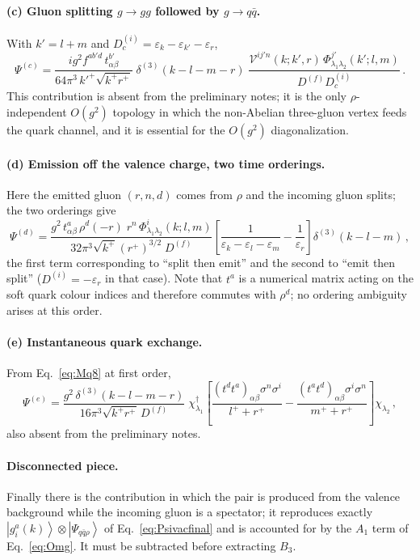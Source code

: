 \documentclass[11pt]{article}
\newcommand{\eps}{\varepsilon}
\newcommand{\dg}{\dagger}
\newcommand{\ket}[1]{\left|#1\right\rangle}
\newcommand{\dthree}{\delta^{(3)}}
\newcommand{\gl}[3]{g^{#1}_{#2}(#3)}
\newcommand{\Phiv}{\Phi}
\newcommand{\Vggg}{\mathcal{V}}
\begin{document}
\paragraph{(c) Gluon splitting $g\to gg$ followed by $g\to q\bar q$.} With $k'=l+m$ and
$D^{(i)}_c=\eps_k-\eps_{k'}-\eps_r$,
\begin{equation}
\Psi^{(c)}=\frac{i g^2 f^{ab'd}\,t^{b'}_{\alpha\beta}}{64\pi^3\,k'^+\sqrt{k^+r^+}}\;
\dthree(k-l-m-r)\;
\frac{\Vggg^{ij'n}(k;k',r)\,\Phiv^{j'}_{\lambda_1\lambda_2}(k';l,m)}{D^{(f)}D^{(i)}_c}\,.
\end{equation}
This contribution is absent from the preliminary notes; it is the only $\rho$-independent
$O(g^2)$ topology in which the non-Abelian three-gluon vertex feeds the quark channel, and it is
essential for the $O(g^2)$ diagonalization.

\paragraph{(d) Emission off the valence charge, two time orderings.} Here the emitted gluon
$(r,n,d)$ comes from $\rho$ and the incoming gluon splits; the two orderings give
\begin{equation}
\Psi^{(d)}=\frac{g^2\,t^a_{\alpha\beta}\,\rho^d(-r)\;r^n\,\Phiv^i_{\lambda_1\lambda_2}(k;l,m)}
{32\pi^3\sqrt{k^+}(r^+)^{3/2}\;D^{(f)}}
\left[\frac{1}{\eps_k-\eps_l-\eps_m}-\frac{1}{\eps_r}\right]\dthree(k-l-m)\,,
\end{equation}
the first term corresponding to ``split then emit'' and the second to ``emit then split''
($D^{(i)}=-\eps_r$ in that case). Note that $t^a$ is a numerical matrix acting on the soft quark
colour indices and therefore commutes with $\rho^d$; no ordering ambiguity arises at this order.

\paragraph{(e) Instantaneous quark exchange.} From Eq.~\eqref{eq:Mq8} at first order,
\begin{equation}
\Psi^{(e)}=\frac{g^2\,\dthree(k-l-m-r)}{16\pi^3\sqrt{k^+r^+}\,D^{(f)}}\;
\chi^\dg_{\lambda_1}\left[\frac{(t^dt^a)_{\alpha\beta}\sigma^n\sigma^i}{l^++r^+}
-\frac{(t^at^d)_{\alpha\beta}\sigma^i\sigma^n}{m^++r^+}\right]\chi_{\lambda_2}\,,
\end{equation}
also absent from the preliminary notes.

\paragraph{Disconnected piece.} Finally there is the contribution in which the pair is produced
from the valence background while the incoming gluon is a spectator; it reproduces exactly
$\ket{\gl{a}{i}{k}}\otimes\ket{\Psi_{q\bar q\rho}}$ of Eq.~\eqref{eq:Psivacfinal} and is accounted
for by the $A_1$ term of Eq.~\eqref{eq:Omg}. It must be subtracted before extracting $B_3$.
\end{document}
